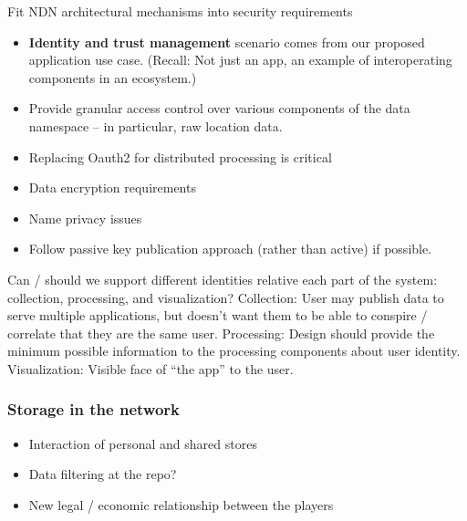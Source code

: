 Fit NDN architectural mechanisms into security requirements
\begin{itemize}
\item \textbf{Identity and trust management} scenario comes from our proposed application use case.  (Recall:  Not just an app, an example of interoperating components in an ecosystem.)
\item Provide granular access control over various components of the data namespace – in particular, raw location data. 
\item Replacing Oauth2 for distributed processing is critical
\item Data encryption requirements
\item Name privacy issues
\item Follow passive key publication approach (rather than active) if possible. 
\end{itemize}
Can / should we support different identities relative each part of the system: collection, processing, and visualization?
Collection: User may publish data to serve multiple applications, but doesn’t want them to be able to conspire / correlate that they are the same user.
Processing:  Design should provide the minimum possible information to the processing components about user identity. 
Visualization: Visible face of “the app” to the user. 

\subsubsection{Storage in the network}
\begin{itemize}
\item Interaction of personal and shared stores
\item Data filtering at the repo?
\item New legal / economic relationship between the players
\end{itemize}
